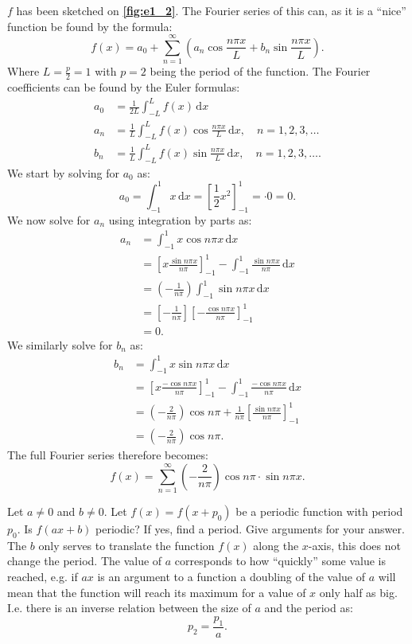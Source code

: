 $f$ has been sketched on \textbf{\autoref{fig:e1_2}}. The Fourier series of this can, as it is a ``nice'' function be found by the formula:
\[ 
f(x) = a_0 + \sum_{n=1}^{\infty} \left( a_n \cos \frac{n \pi x}{L} + b_n \sin \frac{n \pi x}{L} \right)
.\]
Where $L = \frac{p}{2} = 1$ with $p = 2$ being the period of the function. The Fourier coefficients can be found by the Euler formulas:
\begin{align*}
  a_0 &= \frac{1}{2L} \int_{-L}^{L} f(x) \, \mathrm{d}x \\
  a_n &= \frac{1}{L}\int _{-L}^{L} f(x) \cos \frac{n \pi x}{L} \, \mathrm{d}x, \quad n = 1, 2, 3, \ldots  \\
  b_n &= \frac{1}{L} \int_{-L}^{L} f(x) \sin \frac{n \pi x}{L} \, \mathrm{d}x, \quad n = 1, 2, 3, \ldots
.\end{align*}
We start by solving for $a_0$ as:
\[ 
  a_0 =  \int_{-1}^{1} x \, \mathrm{d}x =  \left[ \frac{1}{2} x^2 \right]_{-1}^{1} = \cdot 0 = 0
.\]
We now solve for $a_n$ using integration by parts as:
\begin{align*}
  a_n &= \int_{-1}^{1} x \cos n\pi x \, \mathrm{d}x \\
  &= \left[ x \frac{\sin n\pi x}{n \pi} \right]_{-1}^{1} - \int_{-1}^{1} \frac{\sin n \pi x}{n \pi} \, \mathrm{d}x  \\
  &= \left( - \frac{1}{n\pi} \right) \int_{-1}^{1} \sin n \pi x \, \mathrm{d}x  \\
  &= \left[ - \frac{1}{n \pi} \right] \left[ - \frac{\cos n \pi x}{n \pi} \right]_{-1}^{1} \\
  &= 0
.\end{align*}
We similarly solve for $b_n$ as:
\begin{align*}
  b_n &= \int_{-1}^{1} x \sin n \pi x \, \mathrm{d}x  \\
      &= \left[ x \frac{- \cos n \pi x}{n \pi} \right]_{-1}^{1} - \int_{-1}^{1} \frac{- \cos n \pi x}{n \pi} \, \mathrm{d}x  \\
      &= \left( - \frac{2}{n\pi} \right) \cos n \pi + \frac{1}{n\pi} \left[ \frac{\sin n \pi x}{n \pi} \right]_{-1}^{1}\\
      &= \left( - \frac{2}{n \pi} \right) \cos n \pi
.\end{align*}
The full Fourier series therefore becomes:
\[ 
f(x) = \sum_{n = 1}^{\infty} \left( - \frac{2}{n \pi} \right) \cos n \pi \cdot \sin n \pi x
.\]


Let $a \neq 0$ and $b \neq 0$. Let $f(x) = f(x + p_0)$ be a periodic function with period $p_0$. Is $f(ax + b)$ periodic? If yes, find a period. Give arguments for your answer.
\bigbreak
The $b$ only serves to translate the function $f(x)$ along the $x$-axis, this does not change the period. The value of $a$ corresponds to how ``quickly'' some value is reached, e.g. if $ax$ is an argument to a function a doubling of the value of $a$ will mean that the function will reach its maximum for a value of $x$ only half as big. I.e. there is an inverse relation between the size of $a$ and the period as:
\[ 
p_2 = \frac{p_1}{a}
.\]




